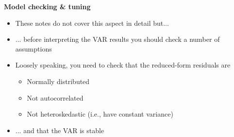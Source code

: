 
\begin{frame}
{\textbf{Model checking \& tuning}}\bigskip \medskip

\begin{itemize}
\item These notes do not cover this aspect in detail but... \bigskip

\item ... before interpreting the VAR results you should check a number of
assumptions\bigskip \pause

\item Loosely speaking, you need to check that the reduced-form residuals
are\smallskip

\begin{itemize}
\item Normally distributed\medskip

\item Not autocorrelated\medskip

\item Not heteroskedastic (i.e., have constant variance)\bigskip \pause
\end{itemize}

\item ... and that the VAR is stable
\end{itemize}
\end{frame}


